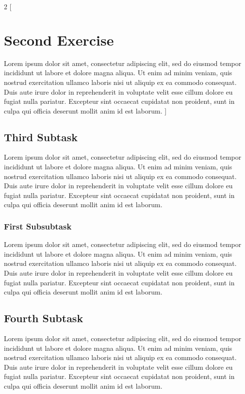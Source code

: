 \documentclass[a4paper, 11pt]{article} %
\begin{document}
\begin{multicols}{2}
    [
        \section{\textbf{Second Exercise}}
        Lorem ipsum dolor sit amet, consectetur adipiscing elit, sed do eiusmod tempor
        incididunt ut labore et dolore magna aliqua. Ut enim ad minim veniam, quis nostrud
        exercitation ullamco laboris nisi ut aliquip ex ea commodo consequat. Duis aute
        irure dolor in reprehenderit in voluptate velit esse cillum dolore eu fugiat nulla
        pariatur. Excepteur sint occaecat cupidatat non proident, sunt in culpa qui officia
        deserunt mollit anim id est laborum.
    ]

    \subsection{\textbf{Third Subtask}}

    Lorem ipsum dolor sit amet, consectetur adipiscing elit, sed do eiusmod tempor incididunt
    ut labore et dolore magna aliqua. Ut enim ad minim veniam, quis nostrud exercitation
    ullamco laboris nisi ut aliquip ex ea commodo consequat. Duis aute irure dolor in
    reprehenderit in voluptate velit esse cillum dolore eu fugiat nulla pariatur. Excepteur
    sint occaecat cupidatat non proident, sunt in culpa qui officia deserunt mollit anim id
    est laborum.

    \subsubsection{\textbf{First Subsubtask}}

    Lorem ipsum dolor sit amet, consectetur adipiscing elit, sed do eiusmod tempor incididunt
    ut labore et dolore magna aliqua. Ut enim ad minim veniam, quis nostrud exercitation
    ullamco laboris nisi ut aliquip ex ea commodo consequat. Duis aute irure dolor in
    reprehenderit in voluptate velit esse cillum dolore eu fugiat nulla pariatur. Excepteur
    sint occaecat cupidatat non proident, sunt in culpa qui officia deserunt mollit anim id
    est laborum.

    \subsection{\textbf{Fourth Subtask}}

    Lorem ipsum dolor sit amet, consectetur adipiscing elit, sed do eiusmod tempor incididunt
    ut labore et dolore magna aliqua. Ut enim ad minim veniam, quis nostrud exercitation
    ullamco laboris nisi ut aliquip ex ea commodo consequat. Duis aute irure dolor in
    reprehenderit in voluptate velit esse cillum dolore eu fugiat nulla pariatur. Excepteur
    sint occaecat cupidatat non proident, sunt in culpa qui officia deserunt mollit anim id
    est laborum.

\end{multicols}
\end{document}
